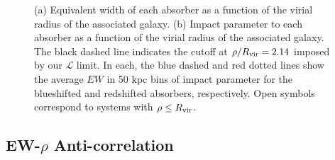 \begin{figure}[ht]
\centering
{}
\caption{\small{(a) Equivalent width of each absorber as a function of the virial radius of the associated galaxy. (b) Impact parameter to each absorber as a function of the virial radius of the associated galaxy. The black dashed line indicates the cutoff at $\rho/R_{\rm vir} =2.14$ imposed by our $\mathcal{L}$ limit.} In each, the blue dashed and red dotted lines show the average $EW$ in 50 kpc bins of impact parameter for the blueshifted and redshifted absorbers, respectively. Open symbols correspond to systems with $\rho \leq R_{\rm vir}$.}
\vspace{5pt}
\end{figure}


\vspace{10pt}


\subsection{EW-$\rho$ Anti-correlation}
\label{ew}

